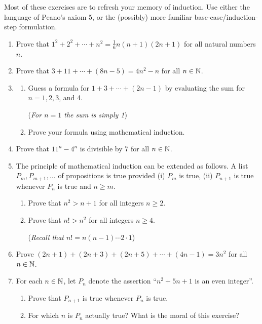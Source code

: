 \begin{exercises}{}{}
	Most of these exercises are to refresh your memory of induction. Use either the language of Peano's axiom 5, or the (possibly) more familiar base-case/induction-step formulation.	
	\begin{enumerate}
	  \item%
	  Prove that $1^2+2^2+\cdots+n^2=\frac 16n(n+1)(2n+1)$ for all natural numbers $n$.
	  
	  
	  \item%
	  Prove that $3+11+\cdots+(8n-5)=4n^2-n$ for all $n\in\mathbb{N}$.
	
	
	  \item%
	  \begin{enumerate}
	  	\item Guess a formula for $1+3+\cdots+(2n-1)$ by evaluating the sum for $n=1,2,3$, and 4.\par
	  	(\emph{For $n=1$ the sum is simply 1})
	  
	  	\item Prove your formula using mathematical induction.
	  \end{enumerate}
	  
	  
	  \item%
	  Prove that $11^n-4^n$ is divisible by 7 for all $n\in\mathbb{N}$.
	  
	  
	  \item%
	  The principle of mathematical induction can be extended as follows. A list $P_m,P_{m+1},\ldots$ of propositions is true provided (i) $P_m$ is true, (ii) $P_{n+1}$ is true whenever $P_n$ is true and $n\ge m$.
	  \begin{enumerate}
	  	\item Prove that $n^2>n+1$ for all integers $n\ge 2$.
	  	\item Prove that $n!>n^2$ for all integers $n\ge 4$.\par
	  	(\emph{Recall that $n!=n(n-1)\cdots 2\cdot 1$})
	  \end{enumerate}
	  
	  
	  \item%
	  Prove $(2n+1)+(2n+3)+(2n+5)+\cdots+(4n-1)=3n^2$ for all $n\in\mathbb{N}$.
	  
	  
	  \item%
	  For each $n\in\mathbb{N}$, let $P_n$ denote the assertion ``$n^2+5n+1$ is an even integer''.
	  \begin{enumerate}
	  	\item Prove that $P_{n+1}$ is true whenever $P_n$ is true.
	  	\item For which $n$ is $P_n$ actually true? What is the moral of this exercise?
	  \end{enumerate}
	  

\end{enumerate}
\end{exercises}
